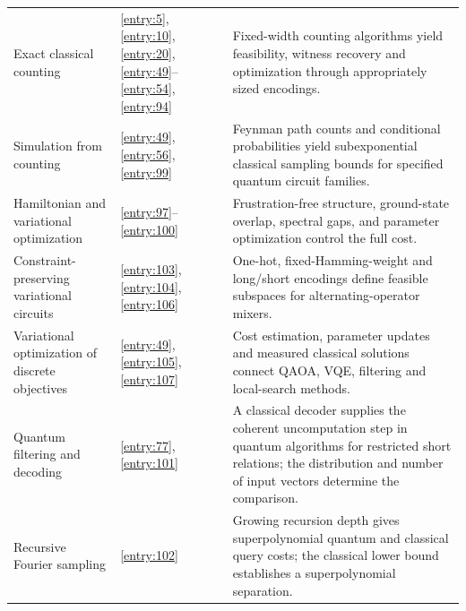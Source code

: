 \documentclass[11pt,a4paper]{article}
\theoremstyle{problemstyle}
\begin{document}
\begin{longtable}{@{}p{}p{}p{}@{}}
Exact classical counting & \ref{entry:5}, \ref{entry:10}, \ref{entry:20}, \ref{entry:49}--\ref{entry:54}, \ref{entry:94} & Fixed-width counting algorithms yield feasibility, witness recovery and optimization through appropriately sized encodings. \\
Simulation from counting & \ref{entry:49}, \ref{entry:56}, \ref{entry:99} & Feynman path counts and conditional probabilities yield subexponential classical sampling bounds for specified quantum circuit families. \\
Hamiltonian and variational optimization & \ref{entry:97}--\ref{entry:100} & Frustration-free structure, ground-state overlap, spectral gaps, and parameter optimization control the full cost. \\
Constraint-preserving variational circuits & \ref{entry:103}, \ref{entry:104}, \ref{entry:106} & One-hot, fixed-Hamming-weight and long/short encodings define feasible subspaces for alternating-operator mixers. \\
Variational optimization of discrete objectives & \ref{entry:49}, \ref{entry:105}, \ref{entry:107} & Cost estimation, parameter updates and measured classical solutions connect QAOA, VQE, filtering and local-search methods. \\
Quantum filtering and decoding & \ref{entry:77}, \ref{entry:101} & A classical decoder supplies the coherent uncomputation step in quantum algorithms for restricted short relations; the distribution and number of input vectors determine the comparison. \\
Recursive Fourier sampling & \ref{entry:102} & Growing recursion depth gives superpolynomial quantum and classical query costs; the classical lower bound establishes a superpolynomial separation. \\
\bottomrule
\end{longtable}
\end{document}
